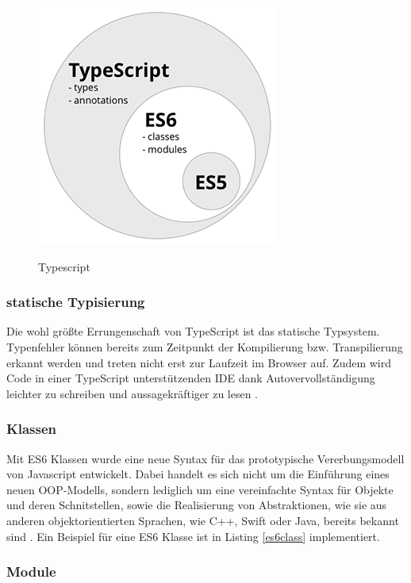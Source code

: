 \begin{figure}[ht]
 \centering
 \includegraphics[width=0.4\linewidth]{kapitel2/typescript----es5-es6-typescript-circle-diagram.png}
 \caption{Typescript}\cite[152]{ng-Book-2}
\end{figure}


\subsubsection{statische Typisierung}

Die wohl größte Errungenschaft von TypeScript ist das statische Typsystem.
Typenfehler können bereits zum Zeitpunkt
der Kompilierung bzw. Transpilierung erkannt werden und treten nicht erst zur Laufzeit im Browser auf.
Zudem wird Code in einer TypeScript unterstützenden IDE dank Autovervollständigung
leichter zu schreiben und aussagekräftiger zu lesen \cite[156]{ng-Book-2}.

\subsubsection{Klassen}

Mit ES6 Klassen wurde eine neue Syntax für das prototypische Vererbungsmodell von Javascript entwickelt.
Dabei handelt es sich nicht um die Einführung eines neuen OOP-Modells, sondern lediglich um eine vereinfachte Syntax für Objekte und deren Schnitstellen,
sowie die Realisierung von Abstraktionen, wie sie aus anderen objektorientierten Sprachen, wie C++, Swift oder Java, bereits bekannt sind \cite{js-Klassen}.
Ein Beispiel für eine ES6 Klasse ist in Listing \ref{es6class} implementiert.

\vspace{0.3cm}


\subsubsection{Module}

